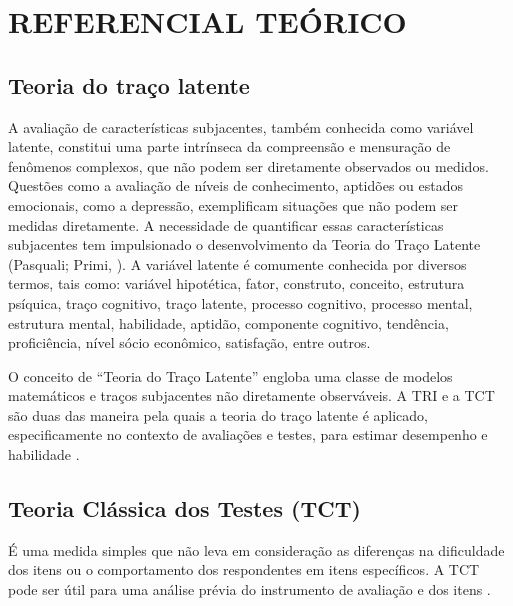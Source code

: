 \chapter{REFERENCIAL TEÓRICO}
\section{Teoria do traço latente}


 A avaliação de características subjacentes, também conhecida como variável latente, constitui uma parte intrínseca da compreensão e mensuração de fenômenos complexos, que não podem ser diretamente observados ou medidos. Questões como a avaliação de níveis de conhecimento, aptidões ou estados emocionais, como a depressão, exemplificam situações que não podem ser medidas diretamente. A necessidade de quantificar essas características subjacentes tem impulsionado o desenvolvimento da Teoria do Traço Latente (Pasquali; Primi, \citeyear{pasquali2003fundamentos}). A variável latente é comumente conhecida por diversos termos, tais como: variável hipotética, fator, construto, conceito, estrutura psíquica, traço cognitivo, traço latente, processo cognitivo, processo mental, estrutura mental, habilidade, aptidão, componente cognitivo, tendência, proficiência, nível sócio econômico, satisfação, entre outros.

O conceito de ``Teoria do Traço Latente''  engloba uma classe de modelos matemáticos e traços subjacentes não diretamente observáveis. A TRI e a TCT são duas das maneira pela quais a teoria do traço latente é aplicado, especificamente no contexto de avaliações e testes, para estimar desempenho e habilidade \cite{pasquali2018}.

\section{Teoria Clássica dos Testes (TCT)}

É uma medida simples que não leva em consideração as diferenças na dificuldade dos itens ou o comportamento dos respondentes em itens específicos. A TCT pode ser útil para uma análise prévia do instrumento de avaliação e dos itens \cite{pasquali1996}.


\begin{comment}
	Na TCT a dificuldade do Item é calculado a partir da proporção de sujeitos que respondem corretamente tal item. O escore bruto é calculado somando-se o número de respostas corretas.
	
 Neste trabalho, são aplicados alguns procedimentos da Teoria Clássica dos Testes, incluindo a análise da Correlação Ponto-Bisserial e do Coeficiente Alfa de Cronbach.
\end{comment}


